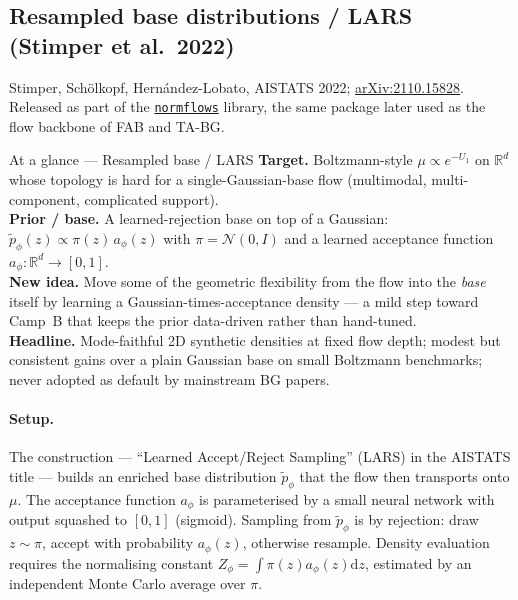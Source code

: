 \documentclass[11pt,letterpaper]{article}
\newcommand{\Real}{\mathbb{R}}
\newcommand{\dd}{\mathrm{d}}
\theoremstyle{plain}
\begin{document}
\subsection{Resampled base distributions / LARS (Stimper et al.\ 2022)}

Stimper, Schölkopf, Hernández-Lobato, AISTATS 2022;
\href{https://arxiv.org/abs/2110.15828}{arXiv:2110.15828}. Released as part of
the \href{https://github.com/VincentStimper/normalizing-flows}{\texttt{normflows}}
library, the same package later used as the flow backbone of FAB and TA-BG.

\begin{methodbox}{At a glance --- Resampled base / LARS}
\textbf{Target.} Boltzmann-style $\mu\propto e^{-U_1}$ on $\Real^d$ whose
topology is hard for a single-Gaussian-base flow (multimodal,
multi-component, complicated support).\\
\textbf{Prior / base.} A learned-rejection base on top of a Gaussian:
$\tilde p_\phi(z)\propto\pi(z)\,a_\phi(z)$ with $\pi=\mathcal N(0,I)$ and a
learned acceptance function $a_\phi:\Real^d\to[0,1]$.\\
\textbf{New idea.} Move some of the geometric flexibility from the flow into
the \emph{base} itself by learning a Gaussian-times-acceptance density --- a
mild step toward Camp~B that keeps the prior data-driven rather than
hand-tuned.\\
\textbf{Headline.} Mode-faithful 2D synthetic densities at fixed flow depth;
modest but consistent gains over a plain Gaussian base on small Boltzmann
benchmarks; never adopted as default by mainstream BG papers.
\end{methodbox}

\paragraph{Setup.} The construction --- ``Learned Accept/Reject Sampling''
(LARS) in the AISTATS title --- builds an enriched base distribution
$\tilde p_\phi$ that the flow then transports onto $\mu$. The acceptance
function $a_\phi$ is parameterised by a small neural network with output
squashed to $[0,1]$ (sigmoid). Sampling from $\tilde p_\phi$ is by rejection:
draw $z\sim\pi$, accept with probability $a_\phi(z)$, otherwise resample.
Density evaluation requires the normalising constant
$Z_\phi=\int\pi(z)a_\phi(z)\dd z$, estimated by an independent Monte Carlo
average over $\pi$.
\end{document}

